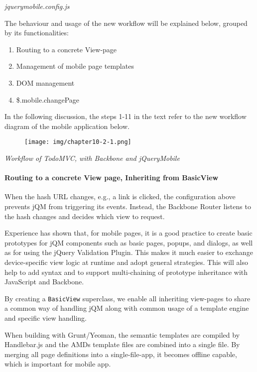 \documentclass[9pt]{book}
\begin{document}
\emph{jquerymobile.config.js}

The behaviour and usage of the new workflow will be explained below,
grouped by its functionalities:

\begin{enumerate}
\def\labelenumi{\alph{enumi})}
\item
  Routing to a concrete View-page
\item
  Management of mobile page templates
\item
  DOM management
\item
  \$.mobile.changePage
\end{enumerate}

In the following discussion, the steps 1-11 in the text refer to the new
workflow diagram of the mobile application below.

\begin{figure}[htbp]
\centering
\texttt{[image: img/chapter10-2-1.png]}
\end{figure}

\emph{Workflow of TodoMVC, with Backbone and jQueryMobile}

\paragraph{Routing to a concrete View page, Inheriting from
BasicView}\label{routing-to-a-concrete-view-page-inheriting-from-basicview}

When the hash URL changes, e.g., a link is clicked, the configuration
above prevents jQM from triggering its events. Instead, the Backbone
Router listens to the hash changes and decides which view to request.

Experience has shown that, for mobile pages, it is a good practice to
create basic prototypes for jQM components such as basic pages, popups,
and dialogs, as well as for using the jQuery Validation Plugin. This
makes it much easier to exchange device-specific view logic at runtime
and adopt general strategies. This will also help to add syntax and to
support multi-chaining of prototype inheritance with JavaScript and
Backbone.

By creating a \texttt{BasicView} superclass, we enable all inheriting
view-pages to share a common way of handling jQM along with common usage
of a template engine and specific view handling.

When building with Grunt/Yeoman, the semantic templates are compiled by
Handlebar.js and the AMDs template files are combined into a single
file. By merging all page definitions into a single-file-app, it becomes
offline capable, which is important for mobile app.
\end{document}
